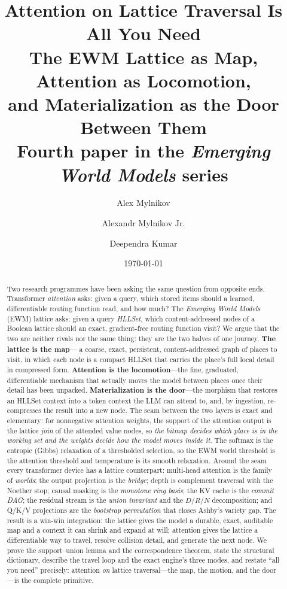 \documentclass[11pt,a4paper]{article}
\title{\textbf{Attention on Lattice Traversal Is All You Need}\\[4pt]
\large The EWM Lattice as Map, Attention as Locomotion,\\
and Materialization as the Door Between Them\\[6pt]
\normalsize Fourth paper in the \textit{Emerging World Models} series}
\author{Alex Mylnikov \and Alexandr Mylnikov Jr. \and Deependra Kumar}
\date{\today}
\theoremstyle{remark}
\begin{document}
\maketitle

\begin{abstract}
Two research programmes have been asking the same question from opposite ends.
Transformer \emph{attention} asks: given a query, which stored items should a
learned, differentiable routing function read, and how much? The \emph{Emerging
World Models} (EWM) lattice asks: given a query \emph{HLLSet}, which
content-addressed nodes of a Boolean lattice should an exact, gradient-free
routing function visit? We argue that the two are neither rivals nor the same
thing: they are the two halves of one journey. \textbf{The lattice is the map}---%
a coarse, exact, persistent, content-addressed graph of places to visit, in
which each node is a compact HLLSet that carries the place's full local detail
in compressed form. \textbf{Attention is the locomotion}---the fine, graduated,
differentiable mechanism that actually moves the model between places once their
detail has been unpacked. \textbf{Materialization is the door}---the morphism
that restores an HLLSet context into a token context the LLM can attend to, and,
by ingestion, re-compresses the result into a new node. The seam between the two
layers is exact and elementary: for nonnegative attention weights, the support
of the attention output is the lattice \emph{join} of the attended value nodes,
so \emph{the bitmap decides which place is in the working set and the weights
decide how the model moves inside it}. The softmax is the entropic (Gibbs)
relaxation of a thresholded selection, so the EWM world threshold is the
attention threshold and temperature is its smooth relaxation. Around the seam
every transformer device has a lattice counterpart: multi-head attention is the
family of \emph{worlds}; the output projection is the \emph{bridge}; depth is
complement traversal with the Noether stop; causal masking is the \emph{monotone
ring basis}; the KV cache is the \emph{commit DAG}; the residual stream is the
\emph{union invariant} and the $D/R/N$ decomposition; and Q/K/V projections are
the \emph{bootstrap permutation} that closes Ashby's variety gap. The result is
a win-win integration: the lattice gives the model a durable, exact, auditable
map and a context it can shrink and expand at will; attention gives the lattice
a differentiable way to travel, resolve collision detail, and generate the next
node. We prove the support--union lemma and the correspondence theorem, state
the structural dictionary, describe the travel loop and the exact engine's three
modes, and restate ``all you need'' precisely: attention \emph{on} lattice
traversal---the map, the motion, and the door---is the complete primitive.
\end{abstract}
\end{document}
